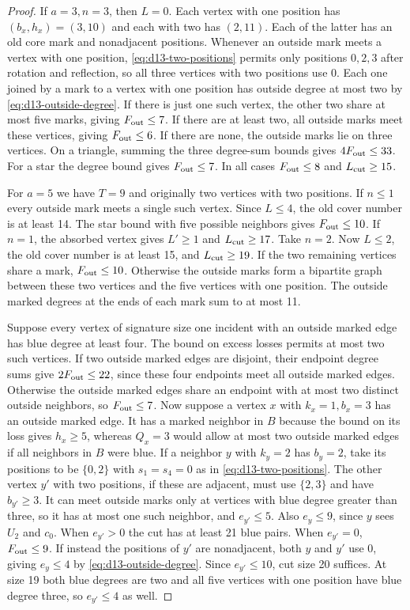 \documentclass[preprint,11pt,numbers]{elsarticle-arxiv}
\numberwithin{equation}{section}
\theoremstyle{definition}
\begin{document}
\begin{proof}
If $a=3,n=3$, then $L=0$. Each vertex with one position has
$(b_x,h_x)=(3,10)$ and each with two has $(2,11)$. Each of the
latter has an old core mark and nonadjacent positions.
Whenever an outside mark meets a vertex with one position,
\eqref{eq:d13-two-positions} permits only positions $0,2,3$ after
rotation and reflection, so all three vertices with two positions
use 0. Each one joined by a mark to a vertex with one position
has outside degree at most two by \eqref{eq:d13-outside-degree}.
If there is just one such vertex, the other two share at most five
marks, giving $F_{\rm out}\le7$. If there are at least two, all
outside marks meet these vertices, giving $F_{\rm out}\le6$. If
there are none, the outside marks lie on three vertices. On a triangle,
summing the three degree-sum bounds gives $4F_{\rm out}\le33$.
For a star the degree bound gives $F_{\rm out}\le7$. In all cases
$F_{\rm out}\le8$ and $L_{\rm cut}\ge15$.

For $a=5$ we have $T=9$ and originally two vertices with two
positions. If $n\le1$ every outside mark meets a single such vertex.
Since $L\le4$, the old cover number is at least 14. The star bound
with five possible neighbors gives $F_{\rm out}\le10$. If $n=1$,
the absorbed vertex gives $L'\ge1$ and $L_{\rm cut}\ge17$.
Take $n=2$. Now $L\le2$, the old cover number is at least 15,
and $L_{\rm cut}\ge19$. If the two remaining vertices share a mark,
$F_{\rm out}\le10$. Otherwise the outside marks form a bipartite
graph between these two vertices and the five vertices with one
position. The outside marked degrees at the ends of each mark sum
to at most 11.

Suppose every vertex of signature size one incident with an
outside marked edge has blue degree at least four. The bound
on excess losses permits at most two such vertices. If two
outside marked edges are disjoint, their endpoint degree sums
give $2F_{\rm out}\le22$, since these four endpoints meet all
outside marked edges. Otherwise the outside marked edges share
an endpoint with at most two distinct outside neighbors, so
$F_{\rm out}\le7$. Now suppose a vertex $x$ with $k_x=1,b_x=3$
has an outside marked edge. It has a marked neighbor in $B$
because the bound on its loss gives $h_x\ge5$, whereas $Q_x=3$
would allow at most two outside marked edges if all neighbors
in $B$ were blue.
If a neighbor $y$ with $k_y=2$ has $b_y=2$, take its positions to
be $\{0,2\}$ with $s_1=s_4=0$ as in \eqref{eq:d13-two-positions}.
The other vertex $y'$ with two positions, if these are adjacent, must
use $\{2,3\}$ and have $b_{y'}\ge3$. It can meet outside marks only
at vertices with blue degree greater than three, so it has at most
one such neighbor, and $e_{y'}\le5$. Also $e_y\le9$, since $y$
sees $U_2$ and $c_0$. When $e_{y'}>0$ the cut has at least 21
blue pairs. When $e_{y'}=0$, $F_{\rm out}\le9$. If instead the positions
of $y'$ are nonadjacent, both $y$ and $y'$ use 0, giving $e_y\le4$
by \eqref{eq:d13-outside-degree}. Since $e_{y'}\le10$, cut size
20 suffices. At size 19 both blue degrees are two and all five vertices
with one position have blue degree three, so $e_{y'}\le4$ as well.


\end{proof}
\end{document}
